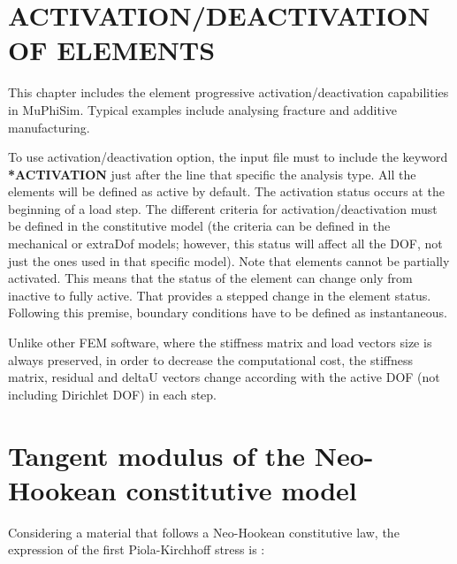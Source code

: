 \documentclass[oneside,11pt,times]{book}
\begin{document}


\appendix
\chapter[APPENDIX A]{ACTIVATION/DEACTIVATION OF ELEMENTS}
This chapter includes the element progressive activation/deactivation capabilities in MuPhiSim. Typical examples include analysing  fracture and additive manufacturing.

To use activation/deactivation option, the input file must to include the keyword \textbf{*ACTIVATION} just after the line that specific the analysis type. All the elements will be defined as active by default. The activation status occurs at the beginning of a load step. The different criteria for activation/deactivation must be defined in the constitutive model (the criteria can be defined in the mechanical or extraDof models; however, this status will affect all the DOF, not just the ones used in that specific model). Note that elements cannot be partially activated. This means that the status of the element can change only from inactive to fully active. That provides a stepped change in the element status. Following this premise, boundary conditions have to be defined as instantaneous.

Unlike other FEM software, where the stiffness matrix and load vectors size is always preserved, in order to decrease the computational cost, the stiffness matrix, residual and deltaU vectors change according with the active DOF (not including Dirichlet DOF) in each step.

\chapter[APPENDIX C]{Tangent modulus of the Neo-Hookean constitutive model}
Considering a material that follows a Neo-Hookean constitutive law, the expression of the first Piola-Kirchhoff stress is :
\end{document}
